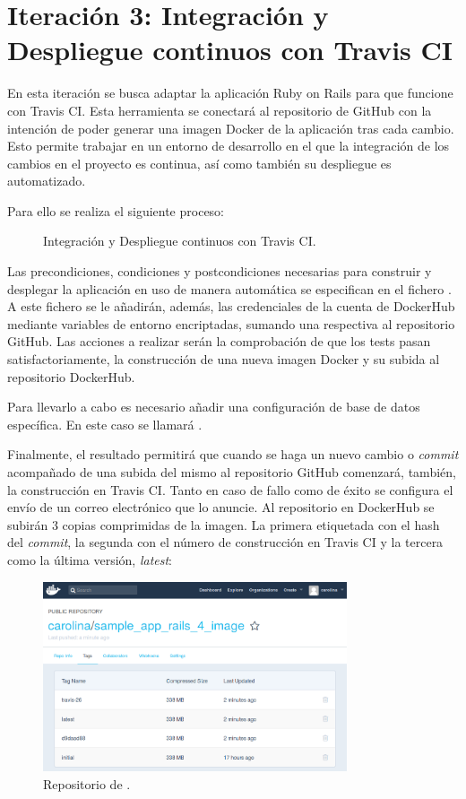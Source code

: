\section{Iteración 3: Integración y Despliegue continuos con Travis CI}

En esta iteración se busca adaptar la aplicación Ruby on Rails para que funcione con Travis CI. Esta herramienta se conectará al repositorio de GitHub  con la intención de poder generar una imagen Docker de la aplicación tras cada cambio. Esto permite trabajar en un entorno de desarrollo en el que la integración de los cambios en el proyecto es continua, así como también su despliegue es automatizado.

Para ello se realiza el siguiente proceso:
\begin{figure}[H]
\caption{Integración y Despliegue continuos con Travis CI.\label{fig:figure_placement_example}}
\end{figure}

Las precondiciones, condiciones y postcondiciones necesarias para construir y desplegar la aplicación en uso de manera automática se especifican en el fichero . A este fichero se le añadirán, además, las credenciales de la cuenta de DockerHub mediante variables de entorno encriptadas, sumando una respectiva al repositorio GitHub. Las acciones a realizar serán la comprobación de que los tests pasan satisfactoriamente, la construcción de una nueva imagen Docker y su subida al repositorio DockerHub.

Para llevarlo a cabo es necesario añadir una configuración de base de datos específica. En este caso se llamará .

Finalmente, el resultado permitirá que cuando se haga un nuevo cambio o \textit{commit} acompañado de una subida del mismo al repositorio GitHub comenzará, también, la construcción en Travis CI. Tanto en caso de fallo como de éxito se configura el envío de un correo electrónico que lo anuncie. Al repositorio en DockerHub se subirán 3 copias comprimidas de la imagen. La primera etiquetada con el hash del \textit{commit}, la segunda con el número de construcción en Travis CI y la tercera como la última versión, \textit{latest}:

\begin{figure}[H]
\centering
\includegraphics[width=0.8\textwidth]{images/figures/dockerhubimages.png}
\caption{Repositorio de .\label{fig:dockerhub_images}}
\end{figure}

